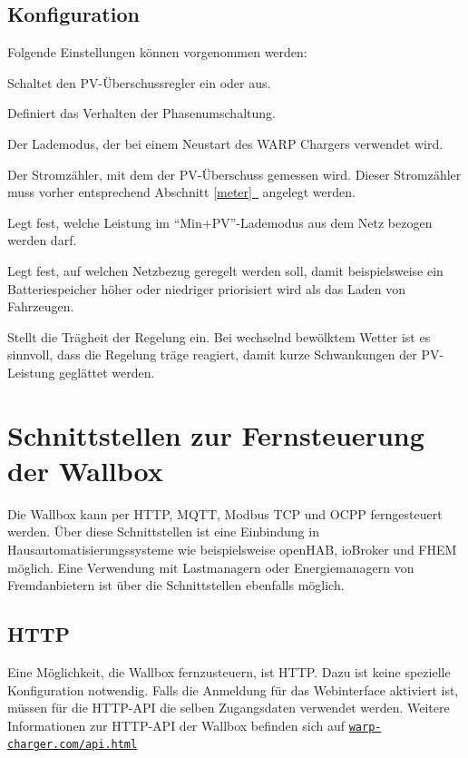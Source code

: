 \documentclass[a4paper,10pt]{article}
\newcommand*{\fullref}[1]{Abschnitt \hyperref[{#1}]{\ref*{#1}~\nameref*{#1}}}
\newcommand\rurl[2]{%
  \href{#1}{\nolinkurl{#2}}%
}
\begin{document}
\begin{multicols*}{2}
	\subsection{Konfiguration}
	Folgende Einstellungen können vorgenommen werden:
	\begin{description}[labelindent=0.5cm, leftmargin=0.5cm]
		\item[Überschussladen aktiviert] Schaltet den PV-Über\-schuss\-regler ein oder aus.
		\item[Umschaltungsmodus] Definiert das Verhalten der Phasenumschaltung.
		\item[Standardlademodus] Der Lademodus, der bei einem Neustart des WARP Chargers verwendet wird.
		\item[Stromzähler] Der Stromzähler, mit dem der PV-Überschuss gemessen wird. Dieser Stromzähler muss vorher entsprechend \fullref{meter} angelegt werden.
		\item[Min+PV: Mindestladeleistung] Legt fest, welche Leistung im \enquote{Min+PV}-Lademodus aus dem Netz bezogen werden darf.
		\item[Regelverhalten] Legt fest, auf welchen
		Netzbezug geregelt werden soll, damit beispielsweise ein Batteriespeicher höher oder niedriger priorisiert wird als das Laden von Fahrzeugen.
		\item[Wolkenfilter] Stellt die Trägheit der Regelung
		ein. Bei wechselnd bewölktem Wetter ist es sinnvoll, dass die Regelung
		träge reagiert, damit kurze Schwankungen der PV-Leistung geglättet werden.
	\end{description}

    \newpage
    \section{Schnittstellen zur Fernsteuerung der Wallbox}\label{interfaces}
    Die Wallbox kann per HTTP, MQTT, Modbus TCP und OCPP ferngesteuert werden. Über diese Schnittstellen ist eine
    Einbindung in Hausautomatisierungssysteme wie beispielsweise openHAB, ioBroker und FHEM möglich.
    Eine Verwendung mit Lastmanagern oder Energiemanagern von Fremdanbietern
    ist über die Schnittstellen ebenfalls möglich.

    \subsection{HTTP}\label{http-interface}
    Eine Möglichkeit, die Wallbox fernzusteuern, ist HTTP. Dazu ist keine
    spezielle Konfiguration notwendig. Falls die Anmeldung für das Webinterface aktiviert ist, müssen für die HTTP-API die selben Zugangsdaten verwendet werden.
    Weitere Informationen zur HTTP-API der Wallbox befinden sich auf \rurl{https://warp-charger.com/api.html}{warp-charger.com/api.html}



\end{multicols*}
\end{document}
